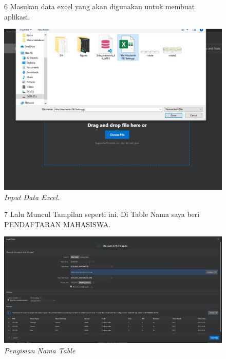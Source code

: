 \begin{enumerate}
\begin{figure}
\item[6] Masukan data excel yang akan digunakan untuk membuat aplikasi.

    \begin{center}
\includegraphics[scale=0.4]{figures/6.jpg}
    \caption{\textit{Input Data Excel.}}
        \end{center}
\label{gambar}
\end{figure}

\begin{figure}
\item[7] Lalu Muncul Tampilan seperti ini. Di Table Nama saya beri PENDAFTARAN MAHASISWA.

    \begin{center}
\includegraphics[scale=0.2]{figures/7.jpg}
    \caption{\textit{Pengisian Nama Table}}
        \end{center}
\label{gambar}
\end{figure}


\end{enumerate}
